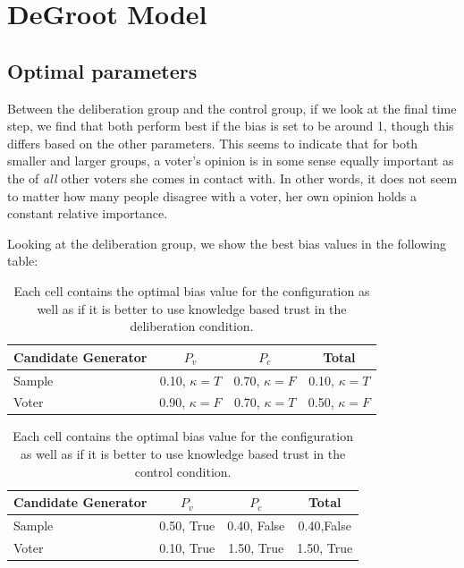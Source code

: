 \section{DeGroot Model}
\label{degroot_results}
\subsection{Optimal parameters}

Between the deliberation group and the control group, if we look at the final
time step, we find that both perform best if the bias is set to be around 1,
though this differs based on the other parameters. This seems to indicate that
for both smaller and larger groups, a voter's opinion is in some sense equally
important as the of  \textit{all} other voters she comes in contact with. In
other words, it does not seem to matter how many people disagree with a voter,
her own opinion holds a constant relative importance.

Looking at the deliberation group, we show the best bias values in the following table:
\begin{table}
	\begin{center}
		\begin{tabular}{lccc}
			\toprule
			Candidate Generator & $P_{v}$            & $P_{c}$           & Total             \\
			\midrule
			Sample              & 0.10, $\kappa = T$ & 0.70, $\kappa =F$ & 0.10, $\kappa =T$ \\
			Voter               & 0.90, $\kappa =F$  & 0.70, $\kappa =T$ & 0.50, $\kappa =F$ \\
			\bottomrule
		\end{tabular}
		\caption{Each cell contains the optimal bias value for the configuration as well as if it is better to use knowledge based trust in the deliberation condition.}\label{tab:opt_delib}
	\end{center}
\end{table}
\begin{table}
	\begin{center}
		\begin{tabular}{lccc}
			\toprule
			Candidate Generator & $P_{v}$    & $P_{c}$     & Total      \\
			\midrule
			Sample              & 0.50, True & 0.40, False & 0.40,False \\
			Voter               & 0.10, True & 1.50, True  & 1.50, True \\
			\bottomrule
		\end{tabular}
		\caption{Each cell contains the optimal bias value for the configuration as well as if it is better to use knowledge based trust in the control condition.}\label{tab:opt_control}
	\end{center}
\end{table}

